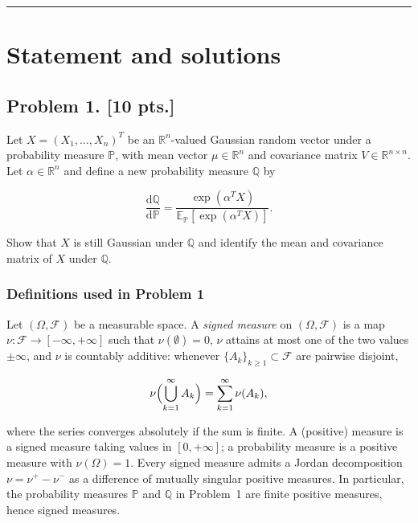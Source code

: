 \documentclass[11pt,a4paper]{article}
\begin{document}
\noindent\rule{\linewidth}{0.4pt}

\section{Statement and solutions}

\subsection{Problem 1. [10 pts.]}
Let \( X = (X_1, \dots, X_n)^T \) be an \( \mathbb{R}^n \)-valued Gaussian random vector under a probability measure \( \mathbb{P} \), with mean vector \( \mu \in \mathbb{R}^n \) and covariance matrix \( V \in \mathbb{R}^{n \times n} \). Let \( \alpha \in \mathbb{R}^n \) and define a new probability measure \( \mathbb{Q} \) by

\[
\frac{\mathrm{d}\mathbb{Q}}{\mathrm{d}\mathbb{P}} = \frac{\exp(\alpha^T X)}{\mathbb{E}_{\mathbb{P}}[\exp(\alpha^T X)]}.
\]

Show that \( X \) is still Gaussian under \( \mathbb{Q} \) and identify the mean and covariance matrix of \( X \) under \( \mathbb{Q} \).

\setcounter{section}{1}

\subsubsection{Definitions used in Problem 1}

\begin{definition}
\label{def:signed-measure}
Let \((\Omega, \mathcal{F})\) be a measurable space. A \emph{signed measure} on \((\Omega, \mathcal{F})\) is a map \(\nu \colon \mathcal{F} \to [-\infty, +\infty]\) such that \(\nu(\emptyset) = 0\), \(\nu\) attains at most one of the two values \(\pm\infty\), and \(\nu\) is countably additive: whenever \(\{A_k\}_{k \ge 1} \subset \mathcal{F}\) are pairwise disjoint,

\[
\nu\Bigl(\bigcup_{k=1}^{\infty} A_k\Bigr)
=
\sum_{k=1}^{\infty} \nu(A_k),
\]

where the series converges absolutely if the sum is finite. A (positive) measure is a signed measure taking values in \([0, +\infty]\); a probability measure is a positive measure with \(\nu(\Omega) = 1\). Every signed measure admits a Jordan decomposition \(\nu = \nu^{+} - \nu^{-}\) as a difference of mutually singular positive measures. In particular, the probability measures \(\mathbb{P}\) and \(\mathbb{Q}\) in Problem~1 are finite positive measures, hence signed measures.
\end{definition}
\end{document}
